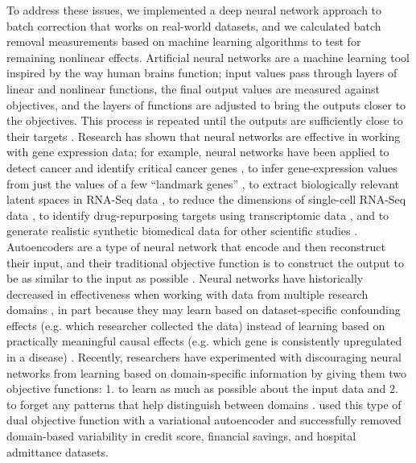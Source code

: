 \documentclass[notitlepage]{article}
\begin{document}
To address these issues, we implemented a deep neural network approach to batch correction that works on real-world datasets, and we calculated batch removal measurements based on machine learning algorithms to test for remaining nonlinear effects.
Artificial neural networks are a machine learning tool inspired by the way human brains function; input values pass through layers of linear and nonlinear functions, the final output values are measured against objectives, and the layers of functions are adjusted to bring the outputs closer to the objectives.
This process is repeated until the outputs are sufficiently close to their targets \citep{schmidhuber_deep_2015}.
Research has shown that neural networks are effective in working with gene expression data; for example, neural networks have been applied
to detect cancer and identify critical cancer genes \citep{danaee_deep_2016},
to infer gene-expression values from just the values of a few ``landmark genes'' \citep{chen_gene_2016},
to extract biologically relevant latent spaces in RNA-Seq data \citep{way_extracting_2017},
to reduce the dimensions of single-cell RNA-Seq data \citep{lin_using_2017},
to identify drug-repurposing targets using transcriptomic data \citep{aliper_deep_2016},
and to generate realistic synthetic biomedical data for other scientific studies \citep{beaulieu-jones_privacy-preserving_2017}.
Autoencoders are a type of neural network that encode and then reconstruct their input, and their traditional objective function is to construct the output to be as similar to the input as possible \citep{hinton_reducing_2006}.
Neural networks have historically decreased in effectiveness when working with data from multiple research domains \citep{ganin_domain-adversarial_2015}, in part because they may learn based on dataset-specific confounding effects (e.g. which researcher collected the data) instead of learning based on practically meaningful causal effects (e.g. which gene is consistently upregulated in a disease) \citep{louizos_causal_2017-2}.
Recently, researchers have experimented with discouraging neural networks from learning based on domain-specific information by giving them two objective functions:
1. to learn as much as possible about the input data and
2. to forget any patterns that help distinguish between domains \citep{ganin_domain-adversarial_2015,tzeng_deep_2014-2}.
\citet{louizos_variational_2015} used this type of dual objective function with a variational autoencoder and successfully removed domain-based variability in credit score, financial savings, and hospital admittance datasets.
\end{document}
